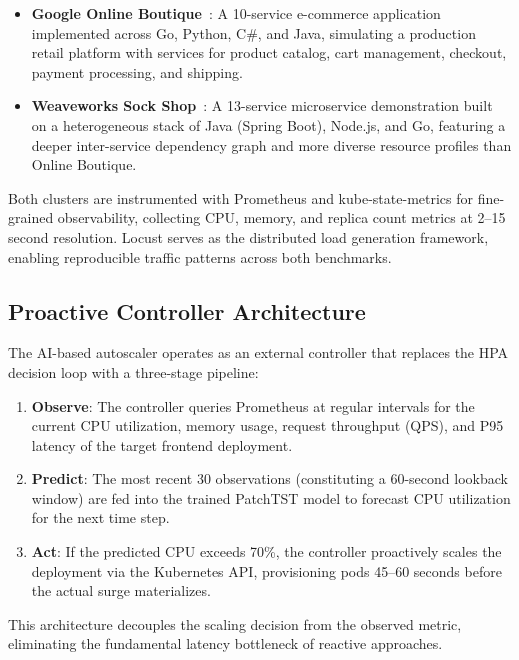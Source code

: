 \documentclass[conference]{IEEEtran}
\begin{document}
\begin{itemize}
    \item \textbf{Google Online Boutique}~\cite{online_boutique}: A 10-service e-commerce application implemented across Go, Python, C\#, and Java, simulating a production retail platform with services for product catalog, cart management, checkout, payment processing, and shipping.
    \item \textbf{Weaveworks Sock Shop}~\cite{sock_shop}: A 13-service microservice demonstration built on a heterogeneous stack of Java (Spring Boot), Node.js, and Go, featuring a deeper inter-service dependency graph and more diverse resource profiles than Online Boutique.
\end{itemize}

Both clusters are instrumented with Prometheus and kube-state-metrics for fine-grained observability, collecting CPU, memory, and replica count metrics at 2--15 second resolution. Locust serves as the distributed load generation framework, enabling reproducible traffic patterns across both benchmarks.

\subsection{Proactive Controller Architecture}
The AI-based autoscaler operates as an external controller that replaces the HPA decision loop with a three-stage pipeline:

\begin{enumerate}
    \item \textbf{Observe}: The controller queries Prometheus at regular intervals for the current CPU utilization, memory usage, request throughput (QPS), and P95 latency of the target frontend deployment.
    \item \textbf{Predict}: The most recent 30 observations (constituting a 60-second lookback window) are fed into the trained PatchTST model to forecast CPU utilization for the next time step.
    \item \textbf{Act}: If the predicted CPU exceeds 70\%, the controller proactively scales the deployment via the Kubernetes API, provisioning pods 45--60 seconds before the actual surge materializes.
\end{enumerate}

This architecture decouples the scaling decision from the observed metric, eliminating the fundamental latency bottleneck of reactive approaches.

\end{document}
